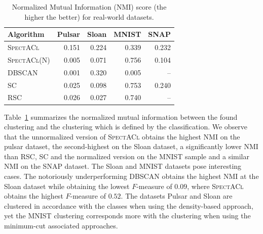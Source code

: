 \begin{table}%
	\centering
	\begin{tabular}{lrrrr}\toprule
	Algorithm & Pulsar & Sloan & MNIST & SNAP  \\\midrule
    \textsc{SpectACl} &	0.151 & 0.224 & 0.339 & 0.232\\
    \textsc{SpectACl}(N) & 0.005 & 0.071 & 0.756 & 0.104\\
    DBSCAN & 0.001 & 0.320 & 0.005 & --\\
    \textsc{SC} & 0.025 & 0.098 & 0.753 & 0.240\\
    \textsc{RSC} & 0.026 & 0.027 &0.740 & --\\ \bottomrule
    \end{tabular}
\caption{Normalized Mutual Information (NMI) score (the higher the better) for real-world datasets.}
\label{tbl:realNMI}
\end{table}
Table~\ref{tbl:realNMI} summarizes the normalized mutual information between the found clustering and the clustering which is defined by the classification. We observe that the unnormalized version of \textsc{SpectACl} obtains the highest NMI on the pulsar dataset, the second-highest on the Sloan dataset, a significantly lower NMI than \textsc{RSC}, \textsc{SC} and the normalized version on the MNIST sample and a similar NMI on the SNAP dataset. The Sloan and MNIST datasets pose interesting cases. The notoriously underperforming DBSCAN obtains the highest NMI at the Sloan dataset while obtaining the lowest $F$-measure of $0.09$, where \textsc{SpectACl} obtains the highest $F$-measure of $0.52$. The datasets Pulsar and Sloan are clustered in accordance with the classes when using the density-based approach, yet the MNIST clustering corresponds more with the clustering when using the minimum-cut associated approaches.

